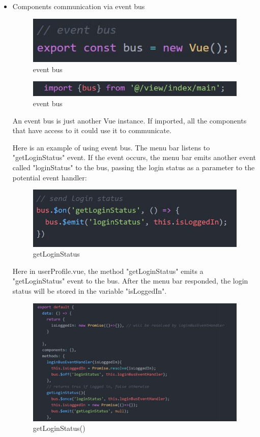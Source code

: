 \documentclass[11pt]{article}
\begin{document}
\begin{spacing}{1.0}
\begin{itemize}
		\item Components communication via event bus
	\begin{figure}[H]
	\centering
	\includegraphics[scale=.5]{figures/js/evbus.jpg}
	\caption{event bus}
\end{figure}		
		
	\begin{figure}[H]
	\centering
	\includegraphics[scale=.5]{figures/js/event bus.jpg}
	\caption{event bus}
\end{figure}
	An event bus is just another Vue instance. If imported, all the components that have access to it could use it to communicate.
	
	Here is an example of using event bus. The menu bar listens to "getLoginStatus" event. If the event occurs, the menu bar emits another event called "loginStatus" to the bus, passing the login status as a parameter to the potential event handler:
	
	\begin{figure}[H]
	\centering
	\includegraphics[scale=.5]{figures/js/getLoginStatus.jpg}
	\caption{getLoginStatus}
\end{figure}
	
	Here in userProfile.vue, the method "getLoginStatus" emits a "getLoginStatus" event to the bus. After the menu bar responded, the login status will be stored in the variable "isLoggedIn".
	\begin{figure}[H]
	\centering
	\includegraphics[scale=.5]{figures/js/userpr.jpg}
	\caption{getLoginStatus()}
\end{figure}	
	

\end{itemize}
\end{spacing}
\end{document}
